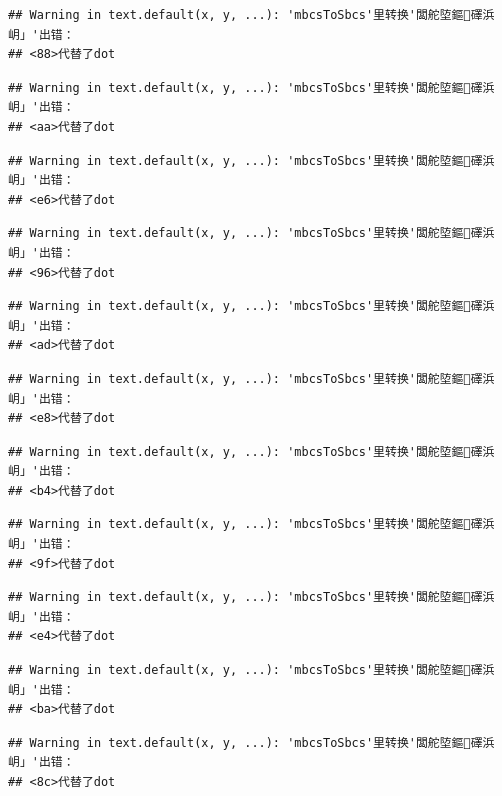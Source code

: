 \documentclass[
]{book}
\begin{document}
\begin{verbatim}
## Warning in text.default(x, y, ...): 'mbcsToSbcs'里转换'闆舵埅鏂礋浜岄」'出错：
## <88>代替了dot
\end{verbatim}

\begin{verbatim}
## Warning in text.default(x, y, ...): 'mbcsToSbcs'里转换'闆舵埅鏂礋浜岄」'出错：
## <aa>代替了dot
\end{verbatim}

\begin{verbatim}
## Warning in text.default(x, y, ...): 'mbcsToSbcs'里转换'闆舵埅鏂礋浜岄」'出错：
## <e6>代替了dot
\end{verbatim}

\begin{verbatim}
## Warning in text.default(x, y, ...): 'mbcsToSbcs'里转换'闆舵埅鏂礋浜岄」'出错：
## <96>代替了dot
\end{verbatim}

\begin{verbatim}
## Warning in text.default(x, y, ...): 'mbcsToSbcs'里转换'闆舵埅鏂礋浜岄」'出错：
## <ad>代替了dot
\end{verbatim}

\begin{verbatim}
## Warning in text.default(x, y, ...): 'mbcsToSbcs'里转换'闆舵埅鏂礋浜岄」'出错：
## <e8>代替了dot
\end{verbatim}

\begin{verbatim}
## Warning in text.default(x, y, ...): 'mbcsToSbcs'里转换'闆舵埅鏂礋浜岄」'出错：
## <b4>代替了dot
\end{verbatim}

\begin{verbatim}
## Warning in text.default(x, y, ...): 'mbcsToSbcs'里转换'闆舵埅鏂礋浜岄」'出错：
## <9f>代替了dot
\end{verbatim}

\begin{verbatim}
## Warning in text.default(x, y, ...): 'mbcsToSbcs'里转换'闆舵埅鏂礋浜岄」'出错：
## <e4>代替了dot
\end{verbatim}

\begin{verbatim}
## Warning in text.default(x, y, ...): 'mbcsToSbcs'里转换'闆舵埅鏂礋浜岄」'出错：
## <ba>代替了dot
\end{verbatim}

\begin{verbatim}
## Warning in text.default(x, y, ...): 'mbcsToSbcs'里转换'闆舵埅鏂礋浜岄」'出错：
## <8c>代替了dot
\end{verbatim}
\end{document}
